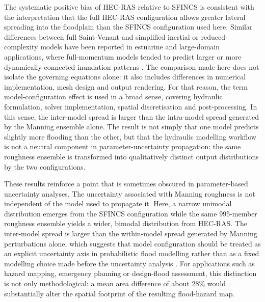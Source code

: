\documentclass[a4paper,fleqn]{cas-sc}
\newcommand{\sfincs}{\textsc{SFINCS}}
\newcommand{\hecras}{\textsc{HEC-RAS}}
\begin{document}
The systematic positive bias of \hecras{} relative to \sfincs{} is consistent with the interpretation that the full \hecras{} configuration allows greater lateral spreading into the floodplain than the \sfincs{} configuration used here. Similar differences between full Saint-Venant and simplified inertial or reduced-complexity models have been reported in estuarine and large-domain applications, where full-momentum models tended to predict larger or more dynamically connected inundation patterns \citep{kumbier2019,shustikova2019}. The comparison made here does not isolate the governing equations alone: it also includes differences in numerical implementation, mesh design and output rendering. For that reason, the term model-configuration effect is used in a broad sense, covering hydraulic formulation, solver implementation, spatial discretisation and post-processing. In this sense, the inter-model spread is larger than the intra-model spread generated by the Manning ensemble alone. The result is not simply that one model predicts slightly more flooding than the other, but that the hydraulic modelling workflow is not a neutral component in parameter-uncertainty propagation: the same roughness ensemble is transformed into qualitatively distinct output distributions by the two configurations.

These results reinforce a point that is sometimes obscured in parameter-based uncertainty analyses. The uncertainty associated with Manning roughness is not independent of the model used to propagate it. Here, a narrow unimodal distribution emerges from the \sfincs{} configuration while the same 995-member roughness ensemble yields a wider, bimodal distribution from \hecras{}. The inter-model spread is larger than the within-model spread generated by Manning perturbations alone, which suggests that model configuration should be treated as an explicit uncertainty axis in probabilistic flood modelling rather than as a fixed modelling choice made before the uncertainty analysis \citep{teng2017}. For applications such as hazard mapping, emergency planning or design-flood assessment, this distinction is not only methodological: a mean area difference of about 28\% would substantially alter the spatial footprint of the resulting flood-hazard map.
\end{document}
